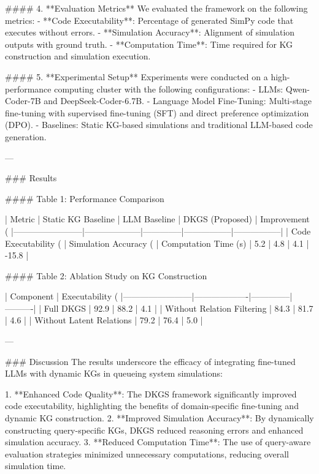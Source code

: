 #### 4. **Evaluation Metrics**  
We evaluated the framework on the following metrics:  
- **Code Executability**: Percentage of generated SimPy code that executes without errors.  
- **Simulation Accuracy**: Alignment of simulation outputs with ground truth.  
- **Computation Time**: Time required for KG construction and simulation execution.  

#### 5. **Experimental Setup**  
Experiments were conducted on a high-performance computing cluster with the following configurations:  
- LLMs: Qwen-Coder-7B and DeepSeek-Coder-6.7B.  
- Language Model Fine-Tuning: Multi-stage fine-tuning with supervised fine-tuning (SFT) and direct preference optimization (DPO).  
- Baselines: Static KG-based simulations and traditional LLM-based code generation.  

---

### Results  

#### Table 1: Performance Comparison  

| Metric                 | Static KG Baseline | LLM Baseline | DKGS (Proposed) | Improvement (%
|------------------------|--------------------|--------------|-----------------|-----------------|
| Code Executability (%
| Simulation Accuracy (%
| Computation Time (s)   | 5.2                | 4.8          | 4.1             | -15.8           |  

#### Table 2: Ablation Study on KG Construction  

| Component              | Executability (%
|------------------------|-------------------|--------------|----------|
| Full DKGS              | 92.9             | 88.2         | 4.1      |
| Without Relation Filtering | 84.3         | 81.7         | 4.6      |
| Without Latent Relations   | 79.2         | 76.4         | 5.0      |  

---

### Discussion  
The results underscore the efficacy of integrating fine-tuned LLMs with dynamic KGs in queueing system simulations:  

1. **Enhanced Code Quality**: The DKGS framework significantly improved code executability, highlighting the benefits of domain-specific fine-tuning and dynamic KG construction.  
2. **Improved Simulation Accuracy**: By dynamically constructing query-specific KGs, DKGS reduced reasoning errors and enhanced simulation accuracy.  
3. **Reduced Computation Time**: The use of query-aware evaluation strategies minimized unnecessary computations, reducing overall simulation time.  

